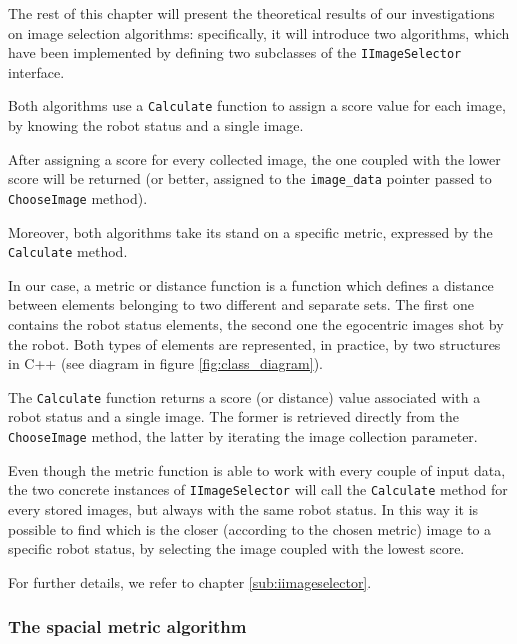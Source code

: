 %
The rest of this chapter will present the theoretical results 
of our investigations on image selection algorithms: 
specifically, it will introduce two algorithms,
which have been implemented by defining two subclasses of 
the \texttt{IImageSelector} interface.
%

%
Both algorithms use a \texttt{Calculate} function to assign a score
value for each image, by knowing the robot status and a single image.
%

%
After assigning a score for every collected image, the one coupled with the
lower score will be returned (or better, assigned to the \texttt{image\_data}
pointer passed to \texttt{ChooseImage} method).
%

%
Moreover, both algorithms take its stand on a specific metric, 
expressed by the \texttt{Calculate}
method.
%

%
In our case, a metric or distance function is a function which defines a
distance between elements belonging to two different and separate sets. The
first one contains the robot status elements, the second one the egocentric images
shot by the robot. Both types of elements are represented, in practice, by two structures
in C++ (see diagram in figure \ref{fig:class_diagram}).
%

%
The \texttt{Calculate} function returns a score (or distance) value associated with a robot
status and a single image. The former is retrieved directly from the \texttt{ChooseImage} 
method, the latter by iterating the image collection parameter.
%

%
Even though the metric function is able to work with every couple of input
data, the two concrete instances of \texttt{IImageSelector} will call
the \texttt{Calculate} method for every stored images, but always with the
same robot status. In this way it is possible to find which is the closer (according to the
chosen metric) image to a specific robot status, by selecting the image coupled with the lowest
score.
%

%
For further details, we refer to chapter \ref{sub:iimageselector}.
%
\subsubsection{The spacial metric algorithm}
\label{subsec:spacial_metric_algorithm}


